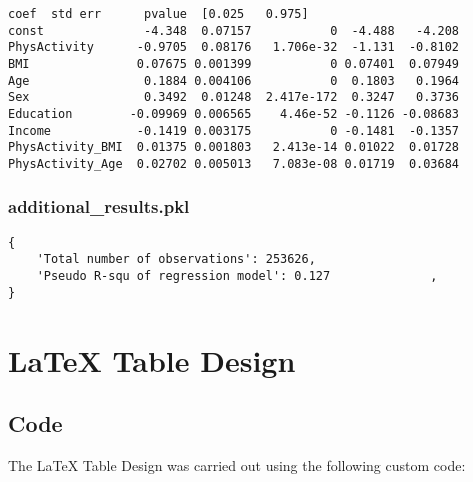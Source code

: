 \documentclass[11pt]{article}
\begin{document}
\begin{Verbatim}[tabsize=4]
                     coef  std err      pvalue  [0.025   0.975]
const              -4.348  0.07157           0  -4.488   -4.208
PhysActivity      -0.9705  0.08176   1.706e-32  -1.131  -0.8102
BMI               0.07675 0.001399           0 0.07401  0.07949
Age                0.1884 0.004106           0  0.1803   0.1964
Sex                0.3492  0.01248  2.417e-172  0.3247   0.3736
Education        -0.09969 0.006565    4.46e-52 -0.1126 -0.08683
Income            -0.1419 0.003175           0 -0.1481  -0.1357
PhysActivity_BMI  0.01375 0.001803   2.413e-14 0.01022  0.01728
PhysActivity_Age  0.02702 0.005013   7.083e-08 0.01719  0.03684
\end{Verbatim}

\subsubsection*{additional\_results.pkl}

\begin{Verbatim}[tabsize=4]
{
    'Total number of observations': 253626,
    'Pseudo R-squ of regression model': 0.127              ,
}
\end{Verbatim}

\section{LaTeX Table Design} \subsection{Code}The LaTeX Table Design was carried out using the following custom code:
\end{document}
